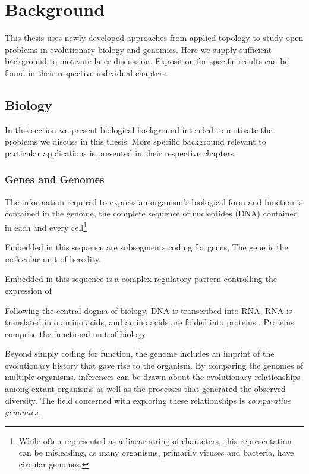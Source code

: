 \chapter{Background}
\label{ch:background}

This thesis uses newly developed approaches from applied topology to study open problems in evolutionary biology and genomics.
Here we supply sufficient background to motivate later discussion.
Exposition for specific results can be found in their respective individual chapters.

\section{Biology}

In this section we present biological background intended to motivate the problems we discuss in this thesis.
More specific background relevant to particular applications is presented in their respective chapters.

\subsection{Genes and Genomes}

The information required to express an organism's biological form and function is contained in the genome, the complete sequence of nucleotides (DNA) contained in each and every cell\footnote{While often represented as a linear string of characters, this representation can be misleading, as many organisms, primarily viruses and bacteria, have circular genomes.}

Embedded in this sequence are subsegments coding for genes, 
The gene is the molecular unit of heredity.

Embedded in this sequence is a complex regulatory pattern controlling the expression of

Following the central dogma of biology, DNA is transcribed into RNA, RNA is translated into amino acids, and amino acids are folded into proteins \cite{Crick:1970wb}.
Proteins comprise the functional unit of biology.

Beyond simply coding for function, the genome includes an imprint of the evolutionary history that gave rise to the organism.
By comparing the genomes of multiple organisms, inferences can be drawn about the evolutionary relationships among extant organisms as well as the processes that generated the observed diversity.
The field concerned with exploring these relationships is \emph{comparative genomics}.

